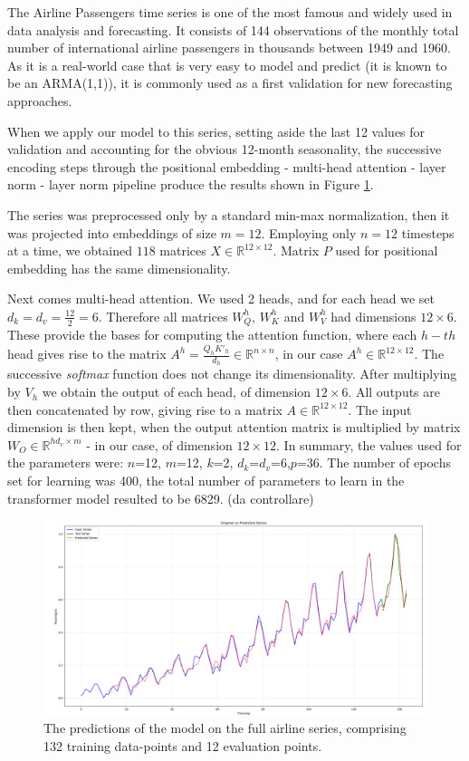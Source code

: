 \documentclass[algorithms,article,submit,pdftex,moreauthors]{Definitions/mdpi}
\begin{document}
The Airline Passengers time series is one of the most famous and widely used in data analysis and forecasting. It consists of 144 observations of the monthly total number of international airline passengers in thousands between 1949 and 1960. As it is a real-world case that is very easy to model and predict (it is known to be an ARMA(1,1)), it is commonly used as a first validation for new forecasting approaches.

When we apply our model to this series, setting aside the last 12 values for validation and accounting for the obvious 12-month seasonality, the successive encoding steps through the positional embedding - multi-head attention - layer norm - layer norm pipeline produce the results shown in Figure \ref{fig:airlines}.

The series was preprocessed only by a standard min-max normalization, then it was projected into embeddings of size $m = 12$. Employing only $n = 12$ timesteps at a time, we obtained $118$ matrices $X \in \mathbb{R}^{12 \times 12}$. Matrix $P$ used for positional embedding has the same dimensionality.

Next comes multi-head attention. We used 2 heads, and for each head we set $d_k = d_v = \frac{12}{2} = 6$. Therefore all matrices $W^h_Q$, $W^h_K$ and $W^h_V$ had dimensions $12 \times 6$. These provide the bases for computing the attention function, where each $h-th$ head gives rise to the matrix $A^h=\frac{Q_hK'_h}{d_h} \in \mathbb{R}^{n \times n}$, in our case $A^h \in \mathbb{R}^{12 \times 12}$. The successive {\em softmax} function does not change its dimensionality. After multiplying by $V_h$ we obtain the output of each head, of dimension $12 \times 6$. All outputs are then concatenated by row, giving rise to a matrix $A \in \mathbb{R}^{12 \times 12}$. The input dimension is then kept, when the output attention matrix is multiplied by matrix $W_O \in \mathbb{R}^{hd_v \times m}$ - in our case, of dimension $12 \times 12$. In summary, the values used for the parameters were: $n$=12, $m$=12, $k$=2, $d_k$=$d_v$=6,$p$=36. The number of epochs set for learning was 400, the total number of parameters to learn in the transformer model resulted to be 6829. (da controllare)

\begin{figure}
	\centering
	\includegraphics[width=0.90\linewidth]{airlines.png}
	\caption{The predictions of the model on the full airline series, comprising 132 training data-points and 12 evaluation points.}
	\label{fig:airlines}
\end{figure}
\end{document}

